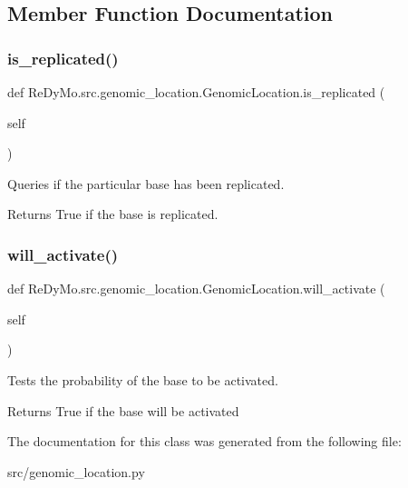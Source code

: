\subsection{Member Function Documentation}
\mbox{\label{classReDyMo_1_1src_1_1genomic__location_1_1GenomicLocation_a4f524b6f975b0b22af1b82aad57af0b3}} 
\subsubsection{\texorpdfstring{is\+\_\+replicated()}{is\_replicated()}}
{\footnotesize\ttfamily def Re\+Dy\+Mo.\+src.\+genomic\+\_\+location.\+Genomic\+Location.\+is\+\_\+replicated (\begin{DoxyParamCaption}\item[{}]{self }\end{DoxyParamCaption})}



Queries if the particular base has been replicated. 

\begin{DoxyReturn}{Returns}
True if the base is replicated. 
\end{DoxyReturn}
\mbox{\label{classReDyMo_1_1src_1_1genomic__location_1_1GenomicLocation_a2cabef230d8c2b1278a92e0e4ff24267}} 
\subsubsection{\texorpdfstring{will\+\_\+activate()}{will\_activate()}}
{\footnotesize\ttfamily def Re\+Dy\+Mo.\+src.\+genomic\+\_\+location.\+Genomic\+Location.\+will\+\_\+activate (\begin{DoxyParamCaption}\item[{}]{self }\end{DoxyParamCaption})}



Tests the probability of the base to be activated. 

\begin{DoxyReturn}{Returns}
True if the base will be activated 
\end{DoxyReturn}


The documentation for this class was generated from the following file\+:\begin{DoxyCompactItemize}
\item 
src/genomic\+\_\+location.\+py\end{DoxyCompactItemize}
